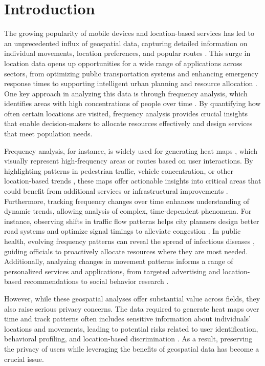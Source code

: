 \section{Introduction}
\label{sec:intro}
The growing popularity of mobile devices and location-based services has led to an unprecedented influx of geospatial data, capturing detailed information on individual movements, location preferences, and popular routes \citep{Statista2015lbs,cheng2017mobile}. This surge in location data opens up opportunities for a wide range of applications across sectors, from optimizing public transportation systems and enhancing emergency response times to supporting intelligent urban planning and resource allocation \cite{ouchra2023overview}. One key approach in analyzing this data is through frequency analysis, which identifies areas with high concentrations of people over time \cite{geo_hong_21}. By quantifying how often certain locations are visited, frequency analysis provides crucial insights that enable decision-makers to allocate resources effectively and design services that meet population needs.

Frequency analysis, for instance, is widely used for generating heat maps \cite{bao2023mapping,hong2017so,peipei2020study}, which visually represent high-frequency areas or routes based on user interactions. By highlighting patterns in pedestrian traffic, vehicle concentration, or other location-based trends \cite{rikalovic2018spatial}, these maps offer actionable insights into critical areas that could benefit from additional services or infrastructural improvements \cite{miranda2023sok}. Furthermore, tracking frequency changes over time enhances understanding of dynamic trends, allowing analysis of complex, time-dependent phenomena. For instance, observing shifts in traffic flow patterns helps city planners design better road systems and optimize signal timings to alleviate congestion \cite{huang2024festgcn}. In public health, evolving frequency patterns can reveal the spread of infectious diseases \cite{bali2024exploring}, guiding officials to proactively allocate resources where they are most needed. Additionally, analyzing changes in movement patterns informs a range of personalized services and applications, from targeted advertising and location-based recommendations to social behavior research \cite{shi2020study}.

However, while these geospatial analyses offer substantial value across fields, they also raise serious privacy concerns. The data required to generate heat maps over time and track patterns often includes sensitive information about individuals' locations and movements, leading to potential risks related to user identification, behavioral profiling, and location-based discrimination \cite{unnikrishnan2013anonymizing,miranda2023sok,solymosi2023privacy}. As a result, preserving the privacy of users while leveraging the benefits of geospatial data has become a crucial issue. 

